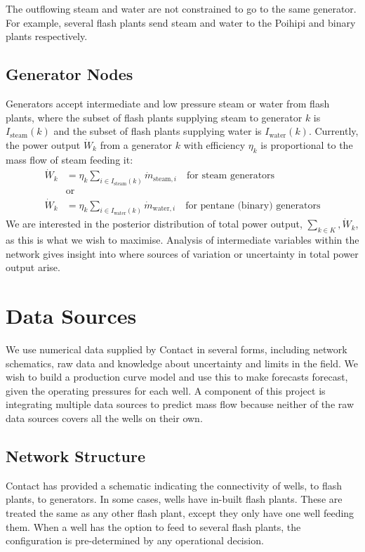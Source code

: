 \documentclass[a4paper, 12pt]{article}
\begin{document}
The outflowing steam and water are not constrained to go to the same generator. For example, several flash plants send steam and water to the Poihipi and binary plants respectively.

\subsection{Generator Nodes}
Generators accept intermediate and low pressure steam or water from flash plants, where the subset of flash plants supplying steam to generator $k$ is $I_{\text{steam}}(k)$ and the subset of flash plants supplying water is $I_{\text{water}}(k)$. Currently, the power output $\dot{W}_k$ from a generator $k$ with efficiency $\eta_k$ is proportional to the mass flow of steam feeding it:
\begin{align}
\dot{W}_k &= \eta_k \sum_{i\in I_{\text{steam}}(k)} \dot{m}_{\text{steam},i}\quad\text{for steam generators}\\
&\text{or}\nonumber\\
\dot{W}_k &= \eta_k \sum_{i\in I_{\text{water}}(k)} \dot{m}_{\text{water},i}\quad\text{for pentane (binary) generators} \label{eq:power}
\end{align}
We are interested in the posterior distribution of total power output, $\sum_{k\in K}, \dot{W}_k$, as this is what we wish to maximise. Analysis of intermediate variables within the network gives insight into where sources of variation or uncertainty in total power output arise.

\section{Data Sources}
We use numerical data supplied by Contact in several forms, including network schematics, raw data and knowledge about uncertainty and limits in the field. We wish to build a production curve model and use this to make forecasts forecast, given the operating pressures for each well. A component of this project is integrating multiple data sources to predict mass flow because neither of the raw data sources covers all the wells on their own.

\subsection{Network Structure}
Contact has provided a schematic indicating the connectivity of wells, to flash plants, to generators. In some cases, wells have in-built flash plants. These are treated the same as any other flash plant, except they only have one well feeding them. When a well has the option to feed to several flash plants, the configuration is pre-determined by any operational decision.
\end{document}
